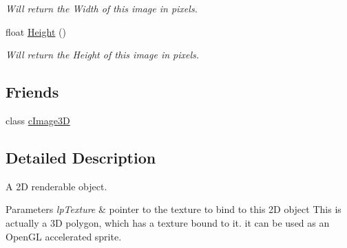 \begin{DoxyCompactItemize}
\begin{DoxyCompactList}\small\item\em Will return the Width of this image in pixels. \end{DoxyCompactList}\item 
\hypertarget{classc_image_adfccfa4a2893b805bf231d5039c27f05}{
float \hyperlink{classc_image_adfccfa4a2893b805bf231d5039c27f05}{Height} ()}
\label{classc_image_adfccfa4a2893b805bf231d5039c27f05}

\begin{DoxyCompactList}\small\item\em Will return the Height of this image in pixels. \end{DoxyCompactList}\end{DoxyCompactItemize}
\subsection*{Friends}
\begin{DoxyCompactItemize}
\item 
\hypertarget{classc_image_ac3e18951e9137b17e506e36253a11cb7}{
class \hyperlink{classc_image_ac3e18951e9137b17e506e36253a11cb7}{cImage3D}}
\label{classc_image_ac3e18951e9137b17e506e36253a11cb7}

\end{DoxyCompactItemize}


\subsection{Detailed Description}
A 2D renderable object. 


\begin{DoxyParams}{Parameters}
{\em lpTexture} & pointer to the texture to bind to this 2D object This is actually a 3D polygon, which has a texture bound to it. it can be used as an OpenGL accelerated sprite. \\
\hline
\end{DoxyParams}
